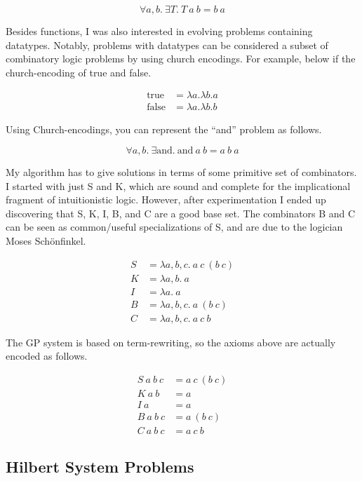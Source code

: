 \documentclass{article}
\newcommand{\n}[1]{\textrm{#1}}
\begin{document}
$$
\forall a,b . ~ \exists T . ~ T ~ a ~ b = b ~ a
$$

Besides functions, I was also interested in evolving problems
containing datatypes. Notably, problems with datatypes can be
considered a subset of combinatory logic problems by using church
encodings. For example, below if the church-encoding of true and
false.

\begin{align*}
\n{true} &= \lambda a. \lambda b. a\\
\n{false} &= \lambda a. \lambda b. b
\end{align*}

Using Church-encodings, you can represent the ``and'' problem as
follows.

$$
\forall a,b . ~ \exists \n{and} . ~ \n{and} ~ a ~ b = a ~ b ~ a
$$

My algorithm has to give solutions in terms of some primitive set of
combinators. I started with just S and K, which are sound and complete
for the implicational fragment of intuitionistic logic. However, after
experimentation I ended up discovering that S, K, I, B, and C are a
good base set. The combinators B and C can be seen as common/useful
specializations of S, and are due to the logician Moses Sch{\"o}nfinkel.

\begin{align*}
S &= \lambda a,b,c . ~ a ~ c ~ (b ~ c)\\
K &= \lambda a,b . ~ a\\
I &= \lambda a . ~ a\\
B &= \lambda a,b,c . ~ a ~ (b ~ c)\\
C &= \lambda a,b,c . ~ a ~ c ~ b
\end{align*}

The GP system is based on term-rewriting, so the axioms above are
actually encoded as follows.

\begin{align*}
S ~ a ~ b ~ c &= a ~ c ~ (b ~ c)\\
K ~ a ~ b &= a\\
I ~ a &= a\\
B ~ a ~ b ~ c &= a ~ (b ~ c)\\
C ~ a ~ b ~ c &= a ~ c ~ b
\end{align*}


\subsection{Hilbert System Problems}
\end{document}
